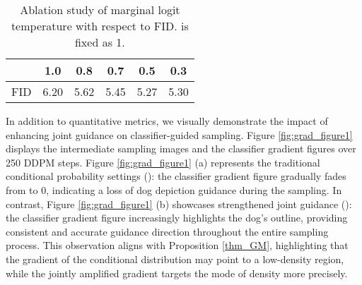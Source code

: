 \documentclass{article}
\theoremstyle{definition}
\begin{document}
\begin{table}[h!]
\caption{Ablation study of marginal logit temperature  with respect to FID.  is fixed as 1.}
\label{table:ablation_temp2}
\begin{center}
\begin{small}
\begin{sc}
\begin{tabular}{lccccc}
\toprule
     & 1.0 & 0.8 & 0.7 & 0.5 & 0.3  \\
\midrule
FID     & 6.20 & 5.62 & 5.45 & 5.27 & 5.30 \\
\bottomrule
\end{tabular}
\end{sc}
\end{small}
\end{center}
\end{table}




In addition to quantitative metrics, we visually demonstrate the impact of enhancing joint guidance on classifier-guided sampling.
Figure \ref{fig:grad_figure1} displays the intermediate sampling images and the classifier gradient figures over 250 DDPM steps. Figure \ref{fig:grad_figure1} (a) represents the traditional conditional probability settings (): the classifier gradient figure gradually fades from  to 0, indicating a loss of dog depiction guidance during the sampling. In contrast, Figure \ref{fig:grad_figure1} (b) 
showcases strengthened joint guidance (): the classifier gradient figure increasingly highlights the dog's outline, providing consistent and accurate guidance direction throughout the entire sampling process.
This observation aligns with Proposition \ref{thm_GM}, highlighting that the gradient of the conditional distribution may point to a low-density region, while the jointly amplified gradient targets the mode of density more precisely.
\end{document}
